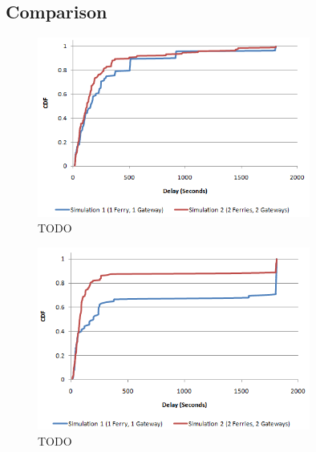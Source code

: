 \subsection{Comparison}

\begin{figure}[htbp]
    \centering
    \includegraphics[width=0.8\textwidth]{images/result_delay_both_128_mc30}
    \caption{TODO}
\end{figure}


\begin{figure}[htbp]
    \centering
    \includegraphics[width=0.8\textwidth]{images/result_delay_both_128_mc5}
    \caption{TODO}
\end{figure}